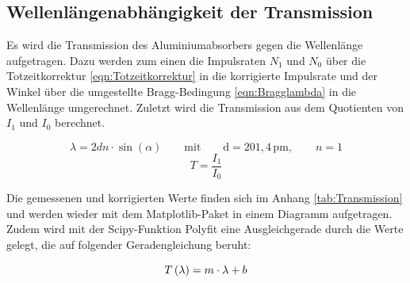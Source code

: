 \documentclass[titlepage = firstcover]{scrartcl}
\begin{document}
        \subsection{Wellenlängenabhängigkeit der Transmission}
        \noindent
        Es wird die Transmission des Aluminiumabsorbers gegen die Wellenlänge aufgetragen. Dazu werden zum einen die Impulsraten $N_1$ und $N_0$ über die 
        Totzeitkorrektur \ref{eqn:Totzeitkorrektur} in die korrigierte Impulsrate und der Winkel über die umgestellte Bragg-Bedingung \ref{eqn:Bragglambda} in die 
        Wellenlänge umgerechnet. Zuletzt wird die Transmission aus dem Quotienten von  $I_1$ und $I_0$ berechnet.

        \begin{equation}
            \lambda = 2dn \cdot \sin(\alpha) \qquad \text{mit} \qquad \text{d}=201,4 \, \text{pm}, \qquad n=1
            \label{eqn:Bragglambda}
        \end{equation}
        \begin{equation}
            T = \frac{I_1}{I_0}
            \label{eqn:Trans}
        \end{equation}
        
        \noindent
        Die gemessenen und korrigierten Werte finden sich im Anhang \ref{tab:Transmission} und werden wieder mit dem Matplotlib-Paket in einem Diagramm aufgetragen. Zudem wird mit der Scipy-Funktion
        Polyfit eine Ausgleichgerade durch die Werte gelegt, die auf folgender Geradengleichung beruht:

        \begin{equation}
            T\left(\lambda \right) = m \cdot \lambda + b\\
            \label{eqn:Regression}
        \end{equation}
\end{document}

